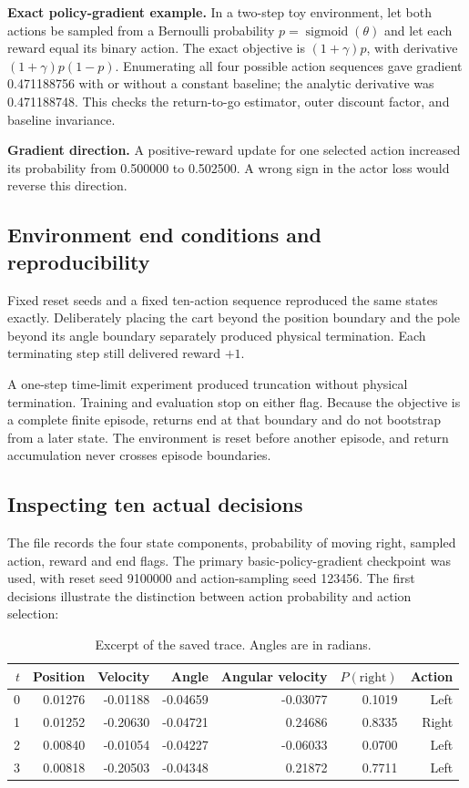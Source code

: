 \documentclass[11pt,letterpaper]{article}
\begin{document}
\textbf{Exact policy-gradient example.} In a two-step toy environment, let both actions be sampled from a Bernoulli probability $p=\operatorname{sigmoid}(\theta)$ and let each reward equal its binary action. The exact objective is $(1+\gamma)p$, with derivative $(1+\gamma)p(1-p)$. Enumerating all four possible action sequences gave gradient 0.471188756 with or without a constant baseline; the analytic derivative was 0.471188748. This checks the return-to-go estimator, outer discount factor, and baseline invariance.

\textbf{Gradient direction.} A positive-reward update for one selected action increased its probability from 0.500000 to 0.502500. A wrong sign in the actor loss would reverse this direction.

\subsection{Environment end conditions and reproducibility}
Fixed reset seeds and a fixed ten-action sequence reproduced the same states exactly. Deliberately placing the cart beyond the position boundary and the pole beyond its angle boundary separately produced physical termination. Each terminating step still delivered reward $+1$.

A one-step time-limit experiment produced truncation without physical termination. Training and evaluation stop on either flag. Because the objective is a complete finite episode, returns end at that boundary and do not bootstrap from a later state. The environment is reset before another episode, and return accumulation never crosses episode boundaries.

\subsection{Inspecting ten actual decisions}
The file  records the four state components, probability of moving right, sampled action, reward and end flags. The primary basic-policy-gradient checkpoint was used, with reset seed 9100000 and action-sampling seed 123456. The first decisions illustrate the distinction between action probability and action selection:

\begin{table}[!ht]
\small
\centering
\caption{Excerpt of the saved trace. Angles are in radians.}
\begin{tabular}{rrrrrrr}
\toprule
$t$ & Position & Velocity & Angle & Angular velocity & $P(\text{right})$ & Action\\
\midrule
0 & 0.01276 & -0.01188 & -0.04659 & -0.03077 & 0.1019 & Left\\
1 & 0.01252 & -0.20630 & -0.04721 & 0.24686 & 0.8335 & Right\\
2 & 0.00840 & -0.01054 & -0.04227 & -0.06033 & 0.0700 & Left\\
3 & 0.00818 & -0.20503 & -0.04348 & 0.21872 & 0.7711 & Left\\
\bottomrule
\end{tabular}
\end{table}
\end{document}
